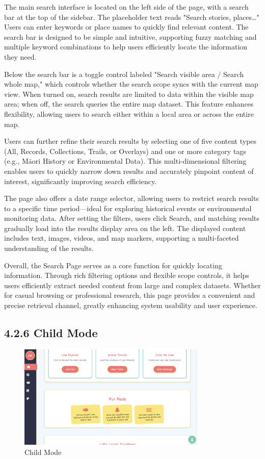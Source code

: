 The main search interface is located on the left side of the page, with a search bar at the top of the sidebar. The placeholder text reads "Search stories, places…" Users can enter keywords or place names to quickly find relevant content. The search bar is designed to be simple and intuitive, supporting fuzzy matching and multiple keyword combinations to help users efficiently locate the information they need.

Below the search bar is a toggle control labeled "Search visible area / Search whole map," which controls whether the search scope syncs with the current map view. When turned on, search results are limited to data within the visible map area; when off, the search queries the entire map dataset. This feature enhances flexibility, allowing users to search either within a local area or across the entire map.

Users can further refine their search results by selecting one of five content types (All, Records, Collections, Trails, or Overlays) and one or more category tags (e.g., Māori History or Environmental Data). This multi-dimensional filtering enables users to quickly narrow down results and accurately pinpoint content of interest, significantly improving search efficiency.

The page also offers a date range selector, allowing users to restrict search results to a specific time period—ideal for exploring historical events or environmental monitoring data. After setting the filters, users click Search, and matching results gradually load into the results display area on the left. The displayed content includes text, images, videos, and map markers, supporting a multi-faceted understanding of the results.

Overall, the Search Page serves as a core function for quickly locating information. Through rich filtering options and flexible scope controls, it helps users efficiently extract needed content from large and complex datasets. Whether for casual browsing or professional research, this page provides a convenient and precise retrieval channel, greatly enhancing system usability and user experience.

\subsection*{4.2.6 Child Mode}
\begin{figure}[H]
    \centering
    \includegraphics[width=0.8\textwidth]{screenshot/prototype_childmode.png}
    \caption{Child Mode}
    \label{fig:architecture}
\end{figure}

